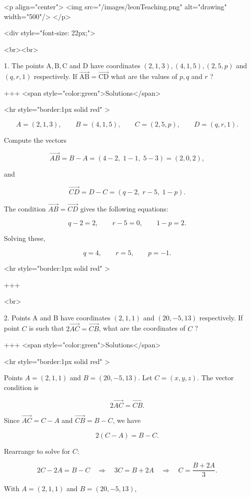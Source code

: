 <p align="center">
<img src="/images/leonTeaching.png" alt="drawing" width="500"/>
</p>

<div style="font-size: 22px;">

<br><br>

1. The points $\mathrm{A}, \mathrm{B}, \mathrm{C}$ and D have coordinates $(2,1,3),(4,1,5),(2,5, p)$ and $(q, r, 1)$ respectively. If $\overrightarrow{\mathrm{AB}}=\overrightarrow{\mathrm{CD}}$ what are the values of $p, q$ and $r$ ?

+++ <span style="color:green">Solutions</span>

<hr style="border:1px solid red" >

$$
A=(2,1,3),\qquad B=(4,1,5),\qquad C=(2,5,p),\qquad D=(q,r,1).
$$

Compute the vectors

$$
\overrightarrow{AB}=B-A=(4-2,\;1-1,\;5-3)=(2,0,2),
$$

and

$$
\overrightarrow{CD}=D-C=(q-2,\;r-5,\;1-p).
$$

The condition $\overrightarrow{AB}=\overrightarrow{CD}$ gives the following equations:

$$
q-2=2,\qquad r-5=0,\qquad 1-p=2.
$$

Solving these,

$$
q=4,\qquad r=5,\qquad p=-1.
$$

<hr style="border:1px solid red" >

+++

<br>

2. Points A and B have coordinates $(2,1,1)$ and $(20,-5,13)$ respectively. If point $C$ is such that $2 \overrightarrow{A C}=\overrightarrow{C B}$, what are the coordinates of $C$ ?

+++ <span style="color:green">Solutions</span>

<hr style="border:1px solid red" >

Points $A=(2,1,1)$ and $B=(20,-5,13)$. Let $C=(x,y,z)$. The vector condition is

$$
2\overrightarrow{AC}=\overrightarrow{CB}.
$$

Since $\overrightarrow{AC}=C-A$ and $\overrightarrow{CB}=B-C$, we have

$$
2(C-A)=B-C.
$$

Rearrange to solve for $C$:

$$
2C-2A=B-C \quad\Longrightarrow\quad 3C=B+2A \quad\Longrightarrow\quad C=\frac{B+2A}{3}.
$$

With $A=(2,1,1)$ and $B=(20,-5,13)$,

